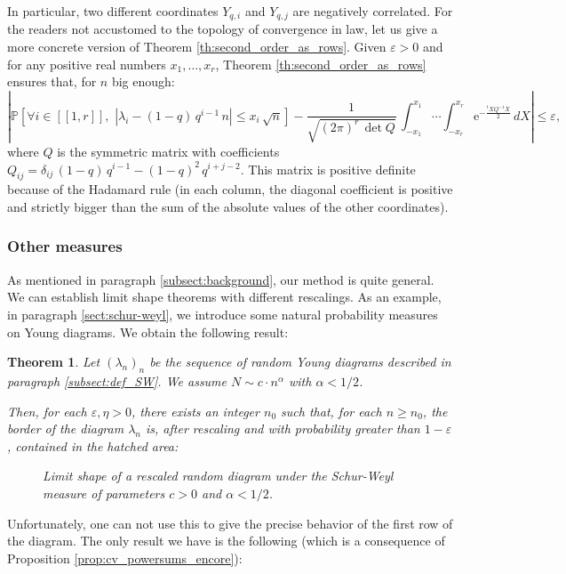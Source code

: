 \documentclass[10pt]{amsart}
\newtheorem{theorem}{Theorem}
\theoremstyle{remark}
\newcommand{\E}{\mathrm{e}}
\newcommand{\proba}{\mathbb{P}}
\newcommand{\eps}{\varepsilon}
\newcommand{\lle}{\left[\!\left[}
\newcommand{\rre}{\right]\!\right]}
\newcommand{\figcap}[2]{\begin{figure}[ht] \begin{center} {\footnotesize{#1}} \caption{#2} \end{center} \end{figure}}
\begin{document}
\noindent In particular, two different coordinates $Y_{q,i}$ and $Y_{q,j}$ are negatively correlated. For the readers not accustomed to the topology of convergence in law, let us give a more concrete version of Theorem \ref{th:second_order_as_rows}. Given $\eps>0$ and for any positive real numbers $x_1,\ldots,x_r$,  Theorem \ref{th:second_order_as_rows} ensures that, for $n$ big enough:
$$\left|\proba\left[ \forall i \in \lle 1,r \rre,\,\, |\lambda_i- (1-q)\,q^{i-1}\,n|\leq x_i\,\sqrt{n} \right]-\frac{1}{\sqrt{(2\pi)^r\,\det Q}}\,\int_{-x_{1}}^{x_1}\cdots\int_{-x_{r}}^{x_r}\E^{-\frac{{}^tXQ^{-1}X}{2}}\,dX\right| \leq \eps,$$
where $Q$ is the symmetric matrix with coefficients
$Q_{ij}=\delta_{ij}\,(1-q)\,q^{i-1}-(1-q)^2\,q^{i+j-2}$.
This matrix is positive definite because of the Hadamard rule
(in each column, the diagonal coefficient is positive and strictly bigger
than the sum of the absolute values of the other coordinates).\bigskip


\subsubsection{Other measures}

As mentioned in paragraph \ref{subsect:background}, our method is quite general. We can establish limit shape theorems with different rescalings. As an example, in paragraph \ref{sect:schur-weyl}, we introduce some natural probability measures on Young diagrams. We obtain the following result:

\begin{theorem} \label{prop:SW_asymptotic_shape}
Let $(\lambda_n)_{n}$ be the sequence of random Young diagrams described in paragraph \ref{subsect:def_SW}.
We assume $N \sim c\cdot n^\alpha$ with $\alpha <1/2$.

Then, for each $\varepsilon, \eta > 0$, there exists an integer $n_0$ such that, for each $n \geq n_0$,
the border of the diagram $\lambda_n$ is, after rescaling and with probability greater than $1 - \varepsilon$, contained
in the hatched area: 
\figcap{}{Limit shape of a rescaled random diagram under the Schur-Weyl measure of parameters $c>0$ and $\alpha<1/2$.\label{fig:rectangle}}
\end{theorem}

Unfortunately, one can not use this to give the precise behavior of the first row of the diagram. The only result we have is the following (which is a consequence of Proposition \ref{prop:cv_powersums_encore}):
\end{document}
